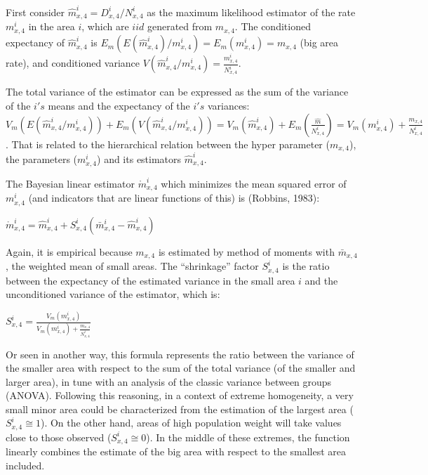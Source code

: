 \documentclass[12pt,]{article}
\begin{document}
First consider \(\hat{m}_{x,4}^{i} = D_{x,4}^{i}/N_{x,4}^{i}\) as the
maximum likelihood estimator of the rate \(m_{x,4}^{i}\) in the area
\(i\), which are \(iid\) generated from \(m_{x,4}\). The conditioned
expectancy of \(\hat{m}_{x,4}^{i}\) is
\(E_{m}(E({\hat{m}}_{x,4}^{i})/m_{x,4}^{i})=E_{m}({m_{x,4}^{i}})=m_{x,4}\)
(big area rate), and conditioned variance
\(V({\hat{m}}_{x,4}^{i}/m_{x,4}^{i}) = \frac{m_{x,4}^{i}}{N_{x,4}^{i}}\).

The total variance of the estimator can be expressed as the sum of the
variance of the \(i's\) means and the expectancy of the \(i's\)
variances:
\(V_{m}(E(\hat{m}_{x,4}^{i}/m_{x,4}^{i})) + E_{m}(V({\hat{m}}_{x,4}^{i}/m_{x,4}^{i}))= V_{m}(\hat{m}_{x,4}^{i}) + E_{m}(\frac{{\hat{m}}}{N_{x,4}^{i}}) = V_{m}(m_{x,4}^{i}) + \frac{m_{x,4}}{N_{x,4}^{i}}\).
That is related to the hierarchical relation between the hyper parameter
(\(m_{x,4}\)), the parameters (\(m_{x,4}^{i}\)) and its estimators
\(\hat{m}_{x,4}^{i}\).

The Bayesian linear estimator \(\mathring{m}_{x, 4}^{i}\) which
minimizes the mean squared error of \({m}_{x,4}^{i}\) (and indicators
that are linear functions of this) is (Robbins, 1983):

\(\mathring{m}_{x,4}^{i}=\hat{m}_{x,4}^{i}+S_{x,4}^{i}(\bar{m}_{x,4}^{i}-\hat{m}_{x,4}^{i})\)

Again, it is empirical because \(m_{x,4}\) is estimated by method of
moments with \(\bar{m}_{x,4}\), the weighted mean of small areas. The
``shrinkage'' factor \(S_{x,4}^{i}\) is the ratio between the expectancy
of the estimated variance in the small area \(i\) and the unconditioned
variance of the estimator, which is:

\(S_{x,4}^{i}=\frac{V_{m}(m_{x,4}^{i})}{V_{m}(m_{x,4}^{i})+\frac{m_{x,4}}{N_{x,4}^{i}}}\)

Or seen in another way, this formula represents the ratio between the
variance of the smaller area with respect to the sum of the total
variance (of the smaller and larger area), in tune with an analysis of
the classic variance between groups (ANOVA). Following this reasoning,
in a context of extreme homogeneity, a very small minor area could be
characterized from the estimation of the largest area
(\(S_{x,4}^{i}\cong 1\)). On the other hand, areas of high population
weight will take values close to those observed
(\(S_{x,4}^{i}\cong 0\)). In the middle of these extremes, the function
linearly combines the estimate of the big area with respect to the
smallest area included.
\end{document}
